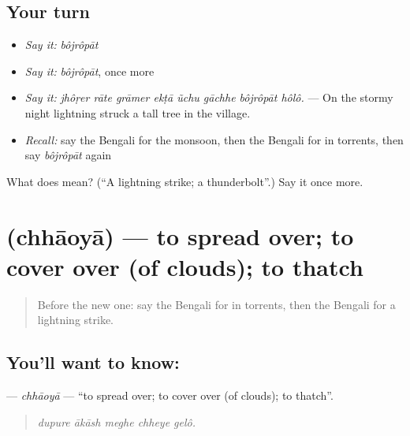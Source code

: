 \subsection*{Your turn}
\begin{itemize}
\raggedright
  \item \emph{Say it:} \emph{bôjrôpāt}
  \item \emph{Say it:} \emph{bôjrôpāt}, once more
  \item \emph{Say it:} \emph{jhôṛer rāte grāmer ekṭā ũchu gāchhe bôjrôpāt hôlô.} — On the stormy night lightning struck a tall tree in the village.
  \item \emph{Recall:} say the Bengali for the monsoon, then the Bengali for in torrents, then say \emph{bôjrôpāt} again
\end{itemize}

\begin{tcolorbox}[breakable,colback=teal!4,colframe=teal!35!black,title={Before you move on}]
What does  mean? (\textquotedblleft{}A lightning strike; a thunderbolt\textquotedblright{}.) Say it once more.
\end{tcolorbox}
\section[\texorpdfstring{\bn{ছাওয়া} (chhāoyā)}{ছাওয়া (chhāoyā)}]{ (chhāoyā) — to spread over; to cover over (of clouds); to thatch}

\label{lesson:BN-C425-chhaoya}



\begin{quote}
Before the new one: say the Bengali for in torrents, then the Bengali for a lightning strike.
\end{quote}

\subsection*{You'll want to know: }
\textbf{} — \emph{chhāoyā} — \textquotedblleft{}to spread over; to cover over (of clouds); to thatch\textquotedblright{}.

\begin{quote}
    
\end{quote}

\begin{quote}
\emph{dupure ākāsh meghe chheye gelô.}
\end{quote}

